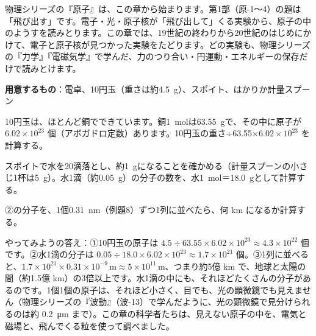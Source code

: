 \noindent 物理シリーズの『原子』は、この章から始まります。第1部（原-1〜4）の題は「飛び出す」です。電子・光・原子核が「飛び出して」くる実験から、原子の中のようすを読みとります。この章では、19世紀の終わりから20世紀のはじめにかけて、電子と原子核が見つかった実験をたどります。どの実験も、物理シリーズの『力学』『電磁気学』で学んだ、力のつり合い・円運動・エネルギーの保存だけで読みとけます。

\begin{yattemiyou}
\textbf{用意するもの}：電卓、10円玉（重さは約\qty{4.5}{g}）、スポイト、はかりか計量スプーン\par\vspace{2pt}
\begin{enumerate}[label={\bkcircled[bkGreen]{\arabic*}}, leftmargin=2.4\zw, itemsep=1pt, topsep=0pt]
\item 10円玉は、ほとんど銅でできています。銅\qty{1}{mol}は\qty{63.55}{g}で、その中に原子が $6.02\times10^{23}$ 個（アボガドロ定数）あります。10円玉の重さ÷63.55×$6.02\times10^{23}$ を計算する。
\item スポイトで水を20滴落とし、約\qty{1}{g}になることを確かめる（計量スプーンの小さじ1杯は\qty{5}{g}）。水1滴（約\qty{0.05}{g}）の分子の数を、水\qty{1}{mol}＝\qty{18.0}{g}として計算する。
\item ②の分子を、1個\qty{0.31}{nm}（例題8）ずつ1列に並べたら、何 km になるか計算する。
\end{enumerate}
\end{yattemiyou}

\noindent やってみようの答え：①10円玉の原子は $4.5\div63.55\times6.02\times10^{23}\approx4.3\times10^{22}$ 個です。②水1滴の分子は $0.05\div18.0\times6.02\times10^{23}\approx1.7\times10^{21}$ 個。③1列に並べると、$1.7\times10^{21}\times0.31\times10^{-9}\,\mathrm{m}\approx5\times10^{11}$\,m、つまり約5億 km で、地球と太陽の間（約1.5億 km）の3倍以上です。水1滴の中にも、それほどたくさんの分子があるのです。1個1個の原子は、それほど小さく、目でも、光の顕微鏡でも見えません（物理シリーズの『波動』（波-13）で学んだように、光の顕微鏡で見分けられるのは約 \qty{0.2}{\micro m} まで）。この章の科学者たちは、見えない原子の中を、電気と磁場と、飛んでくる粒を使って調べました。

\begin{omoidasou}
\end{omoidasou}


